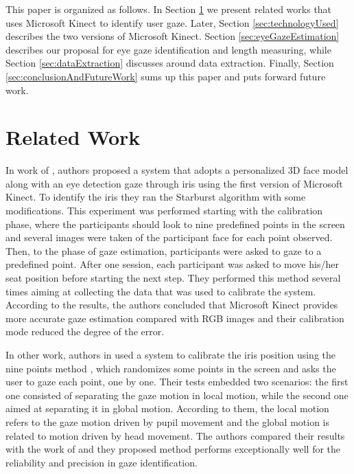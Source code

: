 \documentclass[10pt, conference]{IEEEtran}
\begin{document}
	This paper is organized as follows.
	In Section \ref{sec:relatedWork} we present related works that uses Microsoft Kinect to identify user gaze.
	Later, Section \ref{sec:technologyUsed} describes the two versions of Microsoft Kinect.
	Section \ref{sec:eyeGazeEstimation} describes our proposal for eye gaze identification and length measuring, while Section \ref{sec:dataExtraction} discusses around data extraction.
	Finally, Section \ref{sec:conclusionAndFutureWork} sums up this paper and puts forward future work.

\section{Related Work} \label{sec:relatedWork}

	In work of \cite{7}, authors proposed a system that adopts a personalized 3D face model along with an eye detection gaze through iris using the first version of Microsoft Kinect. 
	To identify the iris they ran the Starburst algorithm \cite{8} with some modifications. 
	This experiment was performed starting with the calibration phase, where the participants should look to nine predefined points in the screen and several images were taken of the participant face for each point observed. 
	Then, to the phase of gaze estimation, participants were asked to gaze to a predefined point. 
	After one session, each participant was asked to move his/her seat position before starting the next step. 
	They performed this method several times aiming at collecting the data that was used to calibrate the system.
	According to the results, the authors concluded that Microsoft Kinect provides more accurate gaze estimation compared with RGB images and their calibration mode reduced the degree of the error.

	In other work, authors in \cite{8} used a system to calibrate the iris position using the nine points method \cite{9}, which randomizes some points in the screen and asks the user to gaze each point, one by one. 
	Their tests embedded two scenarios: the first one consisted of separating the gaze motion in local motion, while the second one aimed at separating it in global motion. 
	According to them, the local motion refers to the gaze motion driven by pupil movement and the global motion is related to motion driven by head movement. 
	The authors compared their results with the work of \cite{9}   and they proposed method performs exceptionally well for the reliability and precision in gaze identification.
\end{document}
